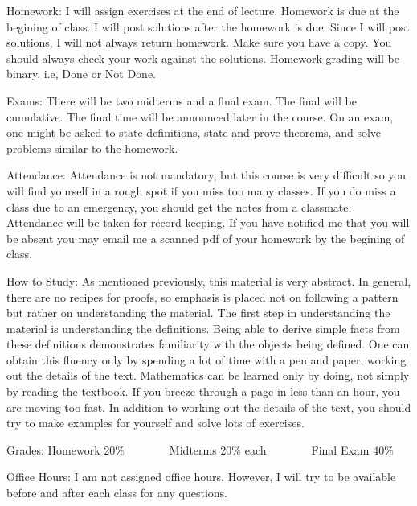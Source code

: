 \documentclass{article}
\begin{document}
	Homework: I will assign exercises at the end of lecture. Homework is due at the begining of class. I will post solutions after the homework is due. Since I will post solutions, I will not always return homework.  Make sure you have a copy. You should always check your work against the solutions. Homework grading will be binary, i.e, Done or Not Done. 
	
	Exams: There will be two midterms and a final exam. The final will be cumulative. The final time will be announced later in the course. On an exam, one might be asked to state definitions, state and prove theorems, and solve problems similar to the homework.
	
	Attendance: Attendance is not mandatory, but this course is very difficult so you will find yourself in a rough spot if you miss too many classes. If you do miss a class due to an emergency, you should get the notes from a classmate. Attendance will be taken for record keeping. If you have notified me that you will be absent you may email me a scanned pdf of your homework by the begining of class. 
	
	How to Study: As mentioned previously, this material is very abstract. In general, there are no recipes for proofs, so emphasis is placed not on following a pattern but rather on understanding the material.  The first step in understanding the material is understanding the definitions. Being able to derive simple facts from these definitions demonstrates familiarity with the objects being defined. One can obtain this fluency only by spending a lot of time with a pen and paper, working out the details of the text. Mathematics can be learned only by doing, not simply by reading the textbook. If you breeze through a page in less than an hour, you are moving too fast. In addition to working out the details of the text, you should try to make examples for yourself and solve lots of exercises.
	
	
	Grades: Homework 20\% 
	\newline\indent$\;\;\;\;\;\;\;\;\;\;\;\;$ Midterms 20\% each 
	\newline\indent$\;\;\;\;\;\;\;\;\;\;\;\;$ Final Exam 40\%
	
	Office Hours: I am not assigned office hours. However, I will try to be available before and after each class for any questions.
\end{document}
